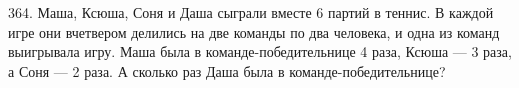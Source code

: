 364. Маша, Ксюша, Соня и Даша сыграли вместе 6 партий в теннис. В каждой игре они вчетвером делились на две команды по два человека, и одна из команд выигрывала игру. Маша была в команде-победительнице 4 раза, Ксюша --- 3 раза, а Соня --- 2 раза. А сколько раз Даша была в команде-победительнице?\\
